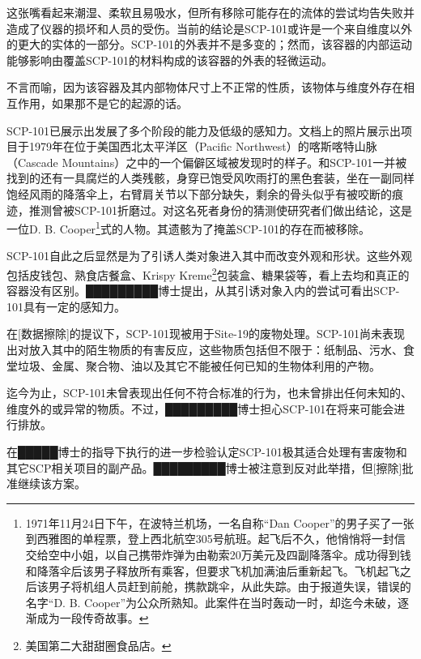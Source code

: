 这张嘴看起来潮湿、柔软且易吸水，但所有移除可能存在的流体的尝试均告失败并造成了仪器的损坏和人员的受伤。当前的结论是SCP-101或许是一个来自维度以外的更大的实体的一部分。SCP-101的外表并不是多变的；然而，该容器的内部运动能够影响由覆盖SCP-101的材料构成的该容器的外表的轻微运动。

不言而喻，因为该容器及其内部物体尺寸上不正常的性质，该物体与维度外存在相互作用，如果那不是它的起源的话。

SCP-101已展示出发展了多个阶段的能力及低级的感知力。文档上的照片展示出项目于1979年在位于美国西北太平洋区（Pacific Northwest）的喀斯喀特山脉（Cascade Mountains）之中的一个偏僻区域被发现时的样子。和SCP-101一并被找到的还有一具腐烂的人类残骸，身穿已饱受风吹雨打的黑色套装，坐在一副同样饱经风雨的降落伞上，右臂肩关节以下部分缺失，剩余的骨头似乎有被咬断的痕迹，推测曾被SCP-101折磨过。对这名死者身份的猜测使研究者们做出结论，这是一位D. B. Cooper\footnote{1971年11月24日下午，在波特兰机场，一名自称“Dan Cooper”的男子买了一张到西雅图的单程票，登上西北航空305号航班。起飞后不久，他悄悄将一封信交给空中小姐，以自己携带炸弹为由勒索20万美元及四副降落伞。成功得到钱和降落伞后该男子释放所有乘客，但要求飞机加满油后重新起飞。飞机起飞之后该男子将机组人员赶到前舱，携款跳伞，从此失踪。由于报道失误，错误的名字“D. B. Cooper”为公众所熟知。此案件在当时轰动一时，却迄今未破，逐渐成为一段传奇故事。}式的人物。其遗骸为了掩盖SCP-101的存在而被移除。

SCP-101自此之后显然是为了引诱人类对象进入其中而改变外观和形状。这些外观包括皮钱包、熟食店餐盒、Krispy Kreme\footnote{美国第二大甜甜圈食品店。}包装盒、糖果袋等，看上去均和真正的容器没有区别。█████████博士提出，从其引诱对象入内的尝试可看出SCP-101具有一定的感知力。

在{[}数据擦除]的提议下，SCP-101现被用于Site-19的废物处理。SCP-101尚未表现出对放入其中的陌生物质的有害反应，这些物质包括但不限于：纸制品、污水、食堂垃圾、金属、聚合物、油以及其它不能被任何已知的生物体利用的产物。

迄今为止，SCP-101未曾表现出任何不符合标准的行为，也未曾排出任何未知的、维度外的或异常的物质。不过，█████████博士担心SCP-101在将来可能会进行排放。

在█████博士的指导下执行的进一步检验认定SCP-101极其适合处理有害废物和其它SCP相关项目的副产品。█████████博士被注意到反对此举措，但{[}擦除]批准继续该方案。
